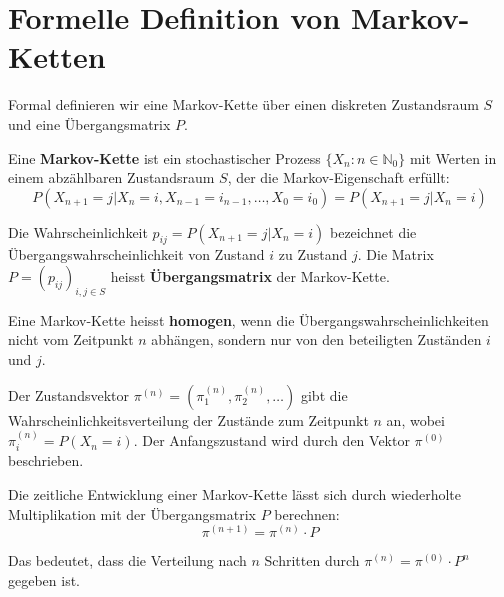 \chapter{Formelle Definition von Markov-Ketten}\label{ch:markov-formal}

Formal definieren wir eine Markov-Kette über einen diskreten Zustandsraum $S$ und eine Übergangsmatrix $P$.

\begin{mydefinition}
Eine \textbf{Markov-Kette} ist ein stochastischer Prozess $\{X_n : n \in \mathbb{N}_0\}$ mit Werten in einem abzählbaren Zustandsraum $S$, der die Markov-Eigenschaft erfüllt:
\[
    P(X_{n+1} = j | X_n = i, X_{n-1} = i_{n-1}, \ldots, X_0 = i_0) = P(X_{n+1} = j | X_n = i)
\]

Die Wahrscheinlichkeit $p_{ij} = P(X_{n+1} = j | X_n = i)$ bezeichnet die Übergangswahrscheinlichkeit von Zustand $i$ zu Zustand $j$. Die Matrix $P = (p_{ij})_{i,j \in S}$ heisst \textbf{Übergangsmatrix} der Markov-Kette.

Eine Markov-Kette heisst \textbf{homogen}, wenn die Übergangswahrscheinlichkeiten nicht vom Zeitpunkt $n$ abhängen, sondern nur von den beteiligten Zuständen $i$ und $j$.
\end{mydefinition}

Der Zustandsvektor $\pi^{(n)} = (\pi_1^{(n)}, \pi_2^{(n)}, \ldots)$ gibt die Wahrscheinlichkeitsverteilung der Zustände zum Zeitpunkt $n$ an, wobei $\pi_i^{(n)} = P(X_n = i)$. Der Anfangszustand wird durch den Vektor $\pi^{(0)}$ beschrieben.

Die zeitliche Entwicklung einer Markov-Kette lässt sich durch wiederholte Multiplikation mit der Übergangsmatrix $P$ berechnen:
\[
    \pi^{(n+1)} = \pi^{(n)} \cdot P
\]

Das bedeutet, dass die Verteilung nach $n$ Schritten durch $\pi^{(n)} = \pi^{(0)} \cdot P^n$ gegeben ist.




